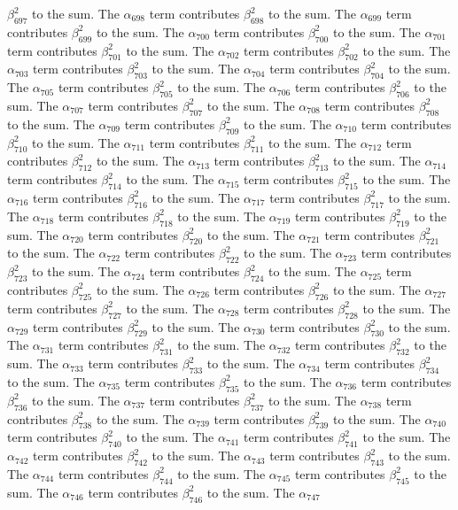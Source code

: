 \begin{lemma}
$\beta_{697}^{2}$ to the sum. The $\alpha_{698}$ term contributes $\beta_{698}^{2}$ to the sum. The $\alpha_{699}$ term contributes $\beta_{699}^{2}$ to the sum. The $\alpha_{700}$ term contributes $\beta_{700}^{2}$ to the sum. The $\alpha_{701}$ term contributes $\beta_{701}^{2}$ to the sum. The $\alpha_{702}$ term contributes $\beta_{702}^{2}$ to the sum. The $\alpha_{703}$ term contributes $\beta_{703}^{2}$ to the sum. The $\alpha_{704}$ term contributes $\beta_{704}^{2}$ to the sum. The $\alpha_{705}$ term contributes $\beta_{705}^{2}$ to the sum. The $\alpha_{706}$ term contributes $\beta_{706}^{2}$ to the sum. The $\alpha_{707}$ term contributes $\beta_{707}^{2}$ to the sum. The $\alpha_{708}$ term contributes $\beta_{708}^{2}$ to the sum. The $\alpha_{709}$ term contributes $\beta_{709}^{2}$ to the sum. The $\alpha_{710}$ term contributes $\beta_{710}^{2}$ to the sum. The $\alpha_{711}$ term contributes $\beta_{711}^{2}$ to the sum. The $\alpha_{712}$ term contributes $\beta_{712}^{2}$ to the sum. The $\alpha_{713}$ term contributes $\beta_{713}^{2}$ to the sum. The $\alpha_{714}$ term contributes $\beta_{714}^{2}$ to the sum. The $\alpha_{715}$ term contributes $\beta_{715}^{2}$ to the sum. The $\alpha_{716}$ term contributes $\beta_{716}^{2}$ to the sum. The $\alpha_{717}$ term contributes $\beta_{717}^{2}$ to the sum. The $\alpha_{718}$ term contributes $\beta_{718}^{2}$ to the sum. The $\alpha_{719}$ term contributes $\beta_{719}^{2}$ to the sum. The $\alpha_{720}$ term contributes $\beta_{720}^{2}$ to the sum. The $\alpha_{721}$ term contributes $\beta_{721}^{2}$ to the sum. The $\alpha_{722}$ term contributes $\beta_{722}^{2}$ to the sum. The $\alpha_{723}$ term contributes $\beta_{723}^{2}$ to the sum. The $\alpha_{724}$ term contributes $\beta_{724}^{2}$ to the sum. The $\alpha_{725}$ term contributes $\beta_{725}^{2}$ to the sum. The $\alpha_{726}$ term contributes $\beta_{726}^{2}$ to the sum. The $\alpha_{727}$ term contributes $\beta_{727}^{2}$ to the sum. The $\alpha_{728}$ term contributes $\beta_{728}^{2}$ to the sum. The $\alpha_{729}$ term contributes $\beta_{729}^{2}$ to the sum. The $\alpha_{730}$ term contributes $\beta_{730}^{2}$ to the sum. The $\alpha_{731}$ term contributes $\beta_{731}^{2}$ to the sum. The $\alpha_{732}$ term contributes $\beta_{732}^{2}$ to the sum. The $\alpha_{733}$ term contributes $\beta_{733}^{2}$ to the sum. The $\alpha_{734}$ term contributes $\beta_{734}^{2}$ to the sum. The $\alpha_{735}$ term contributes $\beta_{735}^{2}$ to the sum. The $\alpha_{736}$ term contributes $\beta_{736}^{2}$ to the sum. The $\alpha_{737}$ term contributes $\beta_{737}^{2}$ to the sum. The $\alpha_{738}$ term contributes $\beta_{738}^{2}$ to the sum. The $\alpha_{739}$ term contributes $\beta_{739}^{2}$ to the sum. The $\alpha_{740}$ term contributes $\beta_{740}^{2}$ to the sum. The $\alpha_{741}$ term contributes $\beta_{741}^{2}$ to the sum. The $\alpha_{742}$ term contributes $\beta_{742}^{2}$ to the sum. The $\alpha_{743}$ term contributes $\beta_{743}^{2}$ to the sum. The $\alpha_{744}$ term contributes $\beta_{744}^{2}$ to the sum. The $\alpha_{745}$ term contributes $\beta_{745}^{2}$ to the sum. The $\alpha_{746}$ term contributes $\beta_{746}^{2}$ to the sum. The $\alpha_{747}$ 
\end{lemma}
